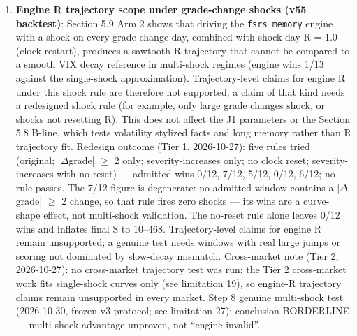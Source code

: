 \documentclass[11pt]{article}
\begin{document}
\begin{enumerate}
\item \textbf{Engine R trajectory scope under grade-change shocks (v55 backtest)}: Section 5.9 Arm 2 shows that driving the \texttt{fsrs\_memory} engine with a shock on every grade-change day, combined with shock-day R = 1.0 (clock restart), produces a sawtooth R trajectory that cannot be compared to a smooth VIX decay reference in multi-shock regimes (engine wins 1/13 against the single-shock approximation). Trajectory-level claims for engine R under this shock rule are therefore not supported; a claim of that kind needs a redesigned shock rule (for example, only large grade changes shock, or shocks not resetting R). This does not affect the J1 parameters or the Section 5.8 B-line, which tests volatility stylized facts and long memory rather than R trajectory fit. Redesign outcome (Tier 1, 2026-10-27): five rules tried (original; |$\Delta$grade| $\geq$ 2 only; severity-increases only; no clock reset; severity-increases with no reset) --- admitted wins 0/12, 7/12, 5/12, 0/12, 6/12; no rule passes. The 7/12 figure is degenerate: no admitted window contains a |$\Delta$grade| $\geq$ 2 change, so that rule fires zero shocks --- its wins are a curve-shape effect, not multi-shock validation. The no-reset rule alone leaves 0/12 wins and inflates final S to 10--468. Trajectory-level claims for engine R remain unsupported; a genuine test needs windows with real large jumps or scoring not dominated by slow-decay mismatch. Cross-market note (Tier 2, 2026-10-27): no cross-market trajectory test was run; the Tier 2 cross-market work fits single-shock curves only (see limitation 19), so engine-R trajectory claims remain unsupported in every market. Step 8 genuine multi-shock test (2026-10-30, frozen v3 protocol; see limitation 27): conclusion BORDERLINE --- multi-shock advantage unproven, not “engine invalid”.
\end{enumerate}
\end{document}
